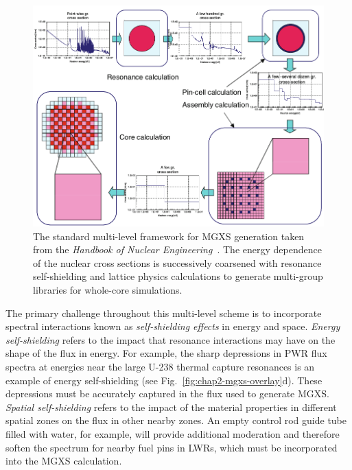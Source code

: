 \begin{figure}[h!]
  \centering
  \includegraphics[width=0.9\linewidth]{figures/mgxs/nuke-handbook-mgxs-process}
\caption[Standard multi-level framework for MGXS generation]{The standard multi-level framework for \ac{MGXS} generation taken from the \textit{Handbook of Nuclear Engineering}~\cite{cacuci2010handbook}. The energy dependence of the nuclear cross sections is successively coarsened with resonance self-shielding and lattice physics calculations to generate multi-group libraries for whole-core simulations.}
\label{fig:chap2-mgxs-process}
\end{figure}


The primary challenge throughout this multi-level scheme is to incorporate spectral interactions known as \textit{self-shielding effects} in energy and space. \textit{Energy self-shielding} refers to the impact that resonance interactions may have on the shape of the flux in energy. For example, the sharp depressions in \ac{PWR} flux spectra at energies near the large U-238 thermal capture resonances is an example of energy self-shielding (see Fig.~\ref{fig:chap2-mgxs-overlay}d). These depressions must be accurately captured in the flux used to generate \ac{MGXS}. \textit{Spatial self-shielding} refers to the impact of the material properties in different spatial zones on the flux in other nearby zones. An empty control rod guide tube filled with water, for example, will provide additional moderation and therefore soften the spectrum for nearby fuel pins in \ac{LWRs}, which must be incorporated into the \ac{MGXS} calculation.

